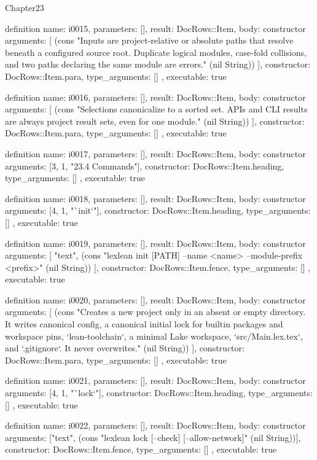 \begin{lexlean}{Chapter23}
\begin{semanticmodule}
definition{
  name: i0015,
  parameters: [],
  result: DocRows::Item,
  body: constructor{
    arguments: [
      (cons "Inputs are project-relative or absolute paths that resolve beneath a configured source root. Duplicate logical modules, case-fold collisions, and two paths declaring the same module are errors." (nil String))
    ],
    constructor: DocRows::Item.para,
    type_arguments: []
  },
  executable: true
}

definition{
  name: i0016,
  parameters: [],
  result: DocRows::Item,
  body: constructor{
    arguments: [
      (cons "Selections canonicalize to a sorted set. APIs and CLI results are always project result sets, even for one module." (nil String))
    ],
    constructor: DocRows::Item.para,
    type_arguments: []
  },
  executable: true
}

definition{
  name: i0017,
  parameters: [],
  result: DocRows::Item,
  body: constructor{
    arguments: [3, 1, "23.4 Commands"],
    constructor: DocRows::Item.heading,
    type_arguments: []
  },
  executable: true
}

definition{
  name: i0018,
  parameters: [],
  result: DocRows::Item,
  body: constructor{
    arguments: [4, 1, "`init`"],
    constructor: DocRows::Item.heading,
    type_arguments: []
  },
  executable: true
}

definition{
  name: i0019,
  parameters: [],
  result: DocRows::Item,
  body: constructor{
    arguments: [
      "text",
      (cons "lexlean init [PATH] --name <name> --module-prefix <prefix>" (nil String))
    ],
    constructor: DocRows::Item.fence,
    type_arguments: []
  },
  executable: true
}

definition{
  name: i0020,
  parameters: [],
  result: DocRows::Item,
  body: constructor{
    arguments: [
      (cons "Creates a new project only in an absent or empty directory. It writes canonical config, a canonical initial lock for builtin packages and workspace pins, `lean-toolchain`, a minimal Lake workspace, `src/Main.lex.tex`, and `.gitignore`. It never overwrites." (nil String))
    ],
    constructor: DocRows::Item.para,
    type_arguments: []
  },
  executable: true
}

definition{
  name: i0021,
  parameters: [],
  result: DocRows::Item,
  body: constructor{
    arguments: [4, 1, "`lock`"],
    constructor: DocRows::Item.heading,
    type_arguments: []
  },
  executable: true
}

definition{
  name: i0022,
  parameters: [],
  result: DocRows::Item,
  body: constructor{
    arguments: ["text", (cons "lexlean lock [--check] [--allow-network]" (nil String))],
    constructor: DocRows::Item.fence,
    type_arguments: []
  },
  executable: true
}


\end{semanticmodule}
\end{lexlean}

